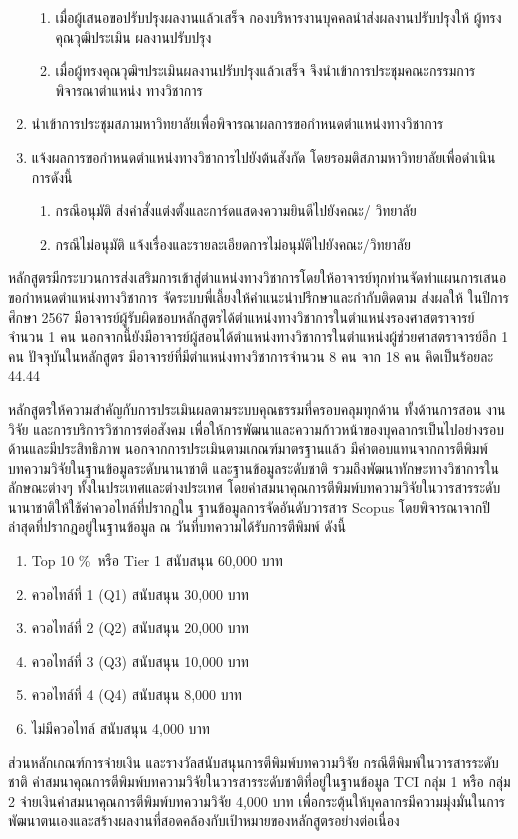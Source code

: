 \begin{enumerate}
\begin{enumerate}[label=9.\arabic*,leftmargin=0.7cm, labelsep=2mm]
\item เมื่อผู้เสนอขอปรับปรุงผลงานแล้วเสร็จ กองบริหารงานบุคคลนำส่งผลงานปรับปรุงให้
ผู้ทรงคุณวุฒิประเมิน ผลงานปรับปรุง
\item เมื่อผู้ทรงคุณวุฒิฯประเมินผลงานปรับปรุงแล้วเสร็จ จึงนำเข้าการประชุมคณะกรรมการ
พิจารณาตำแหน่ง ทางวิชาการ
\end{enumerate}
\item นำเข้าการประชุมสภามหาวิทยาลัยเพื่อพิจารณาผลการขอกำหนดตำแหน่งทางวิชาการ
\item แจ้งผลการขอกำหนดตำแหน่งทางวิชาการไปยังต้นสังกัด โดยรอมติสภามหาวิทยาลัยเพื่อดำเนินการดังนี้
\begin{enumerate}[label=11.\arabic*,leftmargin=0.8cm, labelsep=2mm]
\item กรณีอนุมัติ ส่งคำสั่งแต่งตั้งและการ์ดแสดงความยินดีไปยังคณะ/
วิทยาลัย
\item กรณีไม่อนุมัติ แจ้งเรื่องและรายละเอียดการไม่อนุมัติไปยังคณะ/วิทยาลัย
\end{enumerate}
\end{enumerate}

 หลักสูตรมีกระบวนการส่งเสริมการเข้าสู่ตำแหน่งทางวิชาการโดยให้อาจารย์ทุกท่านจัดทำแผนการเสนอขอกำหนดตำแหน่งทางวิชาการ จัดระบบพี่เลี้ยงให้คำแนะนำปรึกษาและกำกับติดตาม ส่งผลให้
ในปีการศึกษา 2567 มีอาจารย์ผู้รับผิดชอบหลักสูตรได้ตำแหน่งทางวิชาการในตำแหน่งรองศาสตราจารย์ จำนวน 1 คน 
นอกจากนี้ยังมีอาจารย์ผู้สอนได้ตำแหน่งทางวิชาการในตำแหน่งผู้ช่วยศาสตราจารย์อีก 1 คน ปัจจุบันในหลักสูตร
มีอาจารย์ที่มีตำแหน่งทางวิชาการจำนวน 8 คน จาก 18 คน คิดเป็นร้อยละ 44.44

หลักสูตรให้ความสำคัญกับการประเมินผลตามระบบคุณธรรมที่ครอบคลุมทุกด้าน ทั้งด้านการสอน งานวิจัย และการบริการวิชาการต่อสังคม เพื่อให้การพัฒนาและความก้าวหน้าของบุคลากรเป็นไปอย่างรอบด้านและมีประสิทธิภาพ นอกจากการประเมินตามเกณฑ์มาตรฐานแล้ว มีค่าตอบแทนจากการตีพิมพ์บทความวิจัยในฐานข้อมูลระดับนานาชาติ และฐานข้อมูลระดับชาติ รวมถึงพัฒนาทักษะทางวิชาการในลักษณะต่างๆ ทั้งในประเทศและต่างประเทศ โดยค่าสมนาคุณการตีพิมพ์บทความวิจัยในวารสารระดับนานาชาติให้ใช้ค่าควอไทล์ที่ปรากฎใน
ฐานข้อมูลการจัดอันดับวารสาร Scopus โดยพิจารณาจากปีล่าสุดที่ปรากฎอยู่ในฐานข้อมูล ณ
วันที่บทความได้รับการตีพิมพ์ ดังนี้
\begin{enumerate}
	\item Top 10 \%\ หรือ Tier 1 สนับสนุน 60,000 บาท
	\item ควอไทล์ที่ 1 (Q1) สนับสนุน 30,000 บาท
	\item ควอไทล์ที่ 2 (Q2) สนับสนุน 20,000 บาท
	\item ควอไทล์ที่ 3 (Q3) สนับสนุน 10,000 บาท
	\item ควอไทล์ที่ 4 (Q4) สนับสนุน 8,000 บาท
	\item ไม่มีควอไทล์ สนับสนุน 4,000 บาท
\end{enumerate}
ส่วนหลักเกณฑ์การจ่ายเงิน และรางวัลสนับสนุนการตีพิมพ์บทความวิจัย กรณีตีพิมพ์ในวารสารระดับชาติ ค่าสมนาคุณการตีพิมพ์บทความวิจัยในวารสารระดับชาติที่อยู่ในฐานข้อมูล TCI กลุ่ม 1 หรือ กลุ่ม 2 จ่ายเงินค่าสมนาคุณการตีพิมพ์บทความวิจัย 4,000 บาท เพื่อกระตุ้นให้บุคลากรมีความมุ่งมั่นในการพัฒนาตนเองและสร้างผลงานที่สอดคล้องกับเป้าหมายของหลักสูตรอย่างต่อเนื่อง

